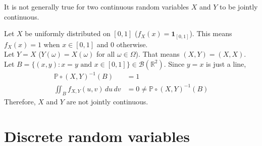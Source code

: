 \documentclass{huhtakm-template-book}
\newcommand{\prob}{\mathbb{P}}
\begin{document}
    \begin{rem}
        It is not generally true for two continuous random variables $X$ and $Y$ to be jointly continuous.
    \end{rem}
    \begin{eg}
        Let $X$ be uniformly distributed on $[0,1]$ ($f_{X}(x)=\mathbf{1}_{[0,1]}$). This means $f_{X}(x)=1$ when $x\in[0,1]$ and $0$ otherwise.\\
        Let $Y=X$ ($Y(\omega)=X(\omega)$ for all $\omega\in\Omega$). That means $(X,Y)=(X,X)$.\\
        Let $B=\{(x,y):x=y\text{ and }x\in[0,1]\}\in\mathcal{B}(\mathbb{R}^{2})$. Since $y=x$ is just a line,
        \begin{align*}
            \prob\circ(X,Y)^{-1}(B)&=1\\
            \iint_{B}f_{X,Y}(u,v)\,du\,dv&=0\neq\prob\circ(X,Y)^{-1}(B)
        \end{align*}
        Therefore, $X$ and $Y$ are not jointly continuous.
    \end{eg}
    
\chapter{Discrete random variables}
\end{document}
